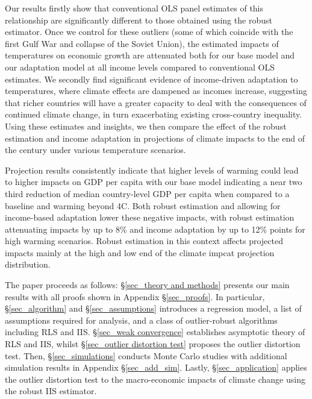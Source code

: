 \documentclass[11pt, letterpaper]{article}
\numberwithin{algorithm}{section}
\numberwithin{assumption}{section}
\numberwithin{lemma}{section}
\numberwithin{theorem}{section}
\numberwithin{corollary}{section}
\numberwithin{remark}{section}
\numberwithin{equation}{section}
\numberwithin{figure}{section}
\numberwithin{table}{section}
\begin{document}
Our results firstly show that conventional OLS panel estimates of this relationship are significantly different to those obtained using the robust estimator. Once we control for these outliers (some of which coincide with the first Gulf War and collapse of the Soviet Union), the estimated impacts of temperatures on economic growth are attenuated both for our base model and our adaptation model at all income levels compared to conventional OLS estimates. We secondly find significant evidence of income-driven adaptation to temperatures, where climate effects are dampened as incomes increase, suggesting that richer countries will have a greater capacity to deal with the consequences of continued climate change, in turn exacerbating existing cross-country inequality. Using these estimates and insights, we then compare the effect of the robust estimation and income adaptation in projections of climate impacts to the end of the century under various temperature scenarios.

Projection results consistently indicate that higher levels of warming could lead to higher impacts on GDP per capita with our base model indicating a near two third reduction of median country-level GDP per capita when compared to a baseline and warming beyond 4\textdegree C. Both robust estimation and allowing for income-based adaptation lower these negative impacts, with robust estimation attenuating impacts by up to 8\% and income adaptation by up to 12\% points for high warming scenarios. Robust estimation in this context affects projected impacts mainly at the high and low end of the climate impcat projection distribution.

The paper proceeds as follows: \S \ref{sec_theory and methods} presents our main results with all proofs shown in Appendix \S \ref{sec_proofs}. In particular, \S \ref{sec_algorithm} and \S \ref{sec_assumptions} introduces a regression model, a list of assumptions required for analysis, and a class of outlier-robust algorithms including RLS and IIS. \S \ref{sec_weak convergence} establishes asymptotic theory of RLS and IIS, whilst \S \ref{sec_outlier distortion test} proposes the outlier distortion test. Then, \S \ref{sec_simulations} conducts Monte Carlo studies with additional simulation results in Appendix \S \ref{sec_add_sim}. Lastly, \S \ref{sec_application} applies the outlier distortion test to the macro-economic impacts of climate change using the robust IIS estimator.
\end{document}
